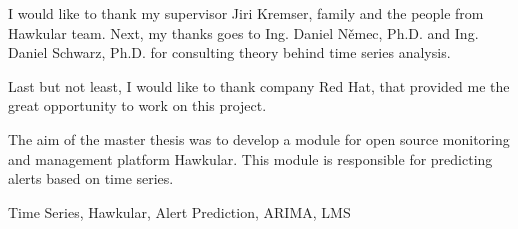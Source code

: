 \documentclass[12pt,oneside]{fithesis2}
\begin{document}
\FrontMatter                    %
\ThesisTitlePage                %
\begin{ThesisDeclaration}       %
  \DeclarationText
  \AdvisorName
\end{ThesisDeclaration}

\begin{ThesisThanks}            %
  I would like to thank my supervisor Jiri Kremser, family and 
  the people from Hawkular team. Next, my thanks goes to Ing. Daniel Němec, Ph.D. and
  Ing. Daniel Schwarz, Ph.D. for consulting theory behind time series analysis. 

  Last but not least, I would like to thank company Red Hat, that provided me 
  the great opportunity to work on this project.
\end{ThesisThanks}

\begin{ThesisAbstract}          %
  The aim of the master thesis was to develop a module for open source monitoring
  and management platform Hawkular. This module is responsible for predicting
  alerts based on time series. 
\end{ThesisAbstract}

\begin{ThesisKeyWords}          %
  Time Series, Hawkular, Alert Prediction, ARIMA, LMS
\end{ThesisKeyWords}

\tableofcontents                %

\MainMatter                     %

    
\end{document}
